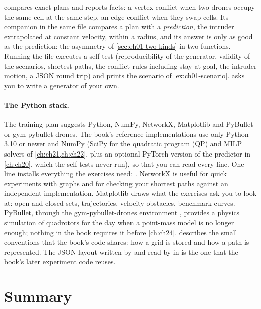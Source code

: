  compares exact plans and reports facts: a vertex conflict when
two drones occupy the same cell at the same step, an edge conflict when they swap
cells. Its companion  in the same file compares a plan with
a \emph{prediction}, the intruder extrapolated at constant velocity, within a radius,
and its answer is only as good as the prediction: the asymmetry of
\cref{sec:ch01-two-kinds} in two functions. Running the file executes a self-test
(reproducibility of the generator, validity of the scenarios, shortest paths, the
conflict rules including stay-at-goal, the intruder motion, a JSON round trip) and
prints the scenario of \cref{ex:ch01-scenario}.  asks you to
write a generator of your own.

\paragraph{The Python stack.}
The training plan suggests Python, NumPy, NetworkX, Matplotlib
and PyBullet or gym-pybullet-drones. The book's reference implementations use only
Python 3.10 or newer and NumPy (SciPy for the quadratic program (QP) and MILP
solvers of \cref{ch:ch21,ch:ch22}, plus an optional PyTorch version of the predictor in
\cref{ch:ch20}, which the self-tests never run), so that you can read every line. One
line installs everything the exercises need:
. NetworkX
\cite{hagberg2008networkx} is useful for quick experiments with graphs and for
checking your shortest paths against an independent implementation. Matplotlib
draws what the exercises ask you to look at: open and closed sets, trajectories,
velocity obstacles, benchmark curves. PyBullet, through the gym-pybullet-drones
environment \cite{panerati2021learning}, provides a physics simulation of quadrotors
for the day when a point-mass model is no longer enough; nothing in the book requires
it before \cref{ch:ch24}.  describes the small conventions that the
book's code shares: how a grid is stored and how a path is represented. The JSON
layout written by  and read by  in
 is the one that the book's later experiment code reuses.

\section{Summary}
\label{sec:ch01-summary}

